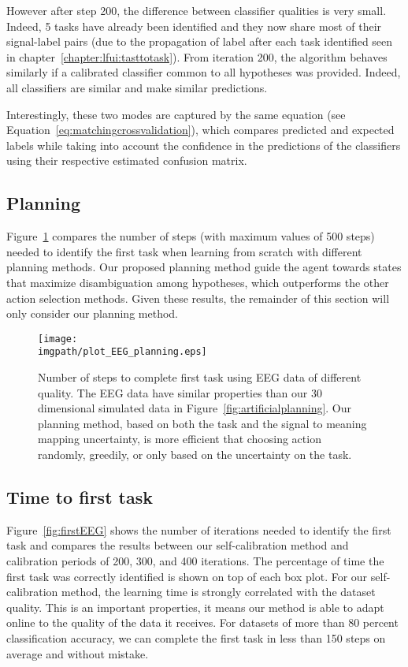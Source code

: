 However after step 200, the difference between classifier qualities is very small. Indeed, 5 tasks have already been identified and they now share most of their signal-label pairs (due to the propagation of label after each task identified seen in chapter~\ref{chapter:lfui:tasttotask}). From iteration 200, the algorithm behaves similarly if a calibrated classifier common to all hypotheses was provided. Indeed,  all classifiers are similar and make similar predictions.

Interestingly, these two modes are captured by the same equation (see Equation~\ref{eq:matchingcrossvalidation}), which compares predicted and expected labels while taking into account the confidence in the predictions of the classifiers using their respective estimated confusion matrix.

\subsection{Planning}

Figure~\ref{fig:planningEEG} compares the number of steps (with maximum values of 500 steps) needed to identify the first task when learning from scratch with different planning methods. Our proposed planning method guide the agent towards states that maximize disambiguation among hypotheses, which outperforms the other action selection methods. Given these results, the remainder of this section will only consider our planning method.

\begin{figure}[!htbp]
    \centering
    \texttt{[image: \\imgpath/plot\_EEG\_planning.eps]}
    \caption{Number of steps to complete first task using EEG data of different quality. The EEG data have similar properties than our 30 dimensional simulated data in Figure~\ref{fig:artificialplanning}. Our planning method, based on both the task and the signal to meaning mapping uncertainty, is more efficient that choosing action randomly, greedily, or only based on the uncertainty on the task.}
    \label{fig:planningEEG}
\end{figure}

\subsection{Time to first task}

Figure~\ref{fig:firstEEG} shows the number of iterations needed to identify the first task and compares the results between our self-calibration method and calibration periods of 200, 300, and 400 iterations. The percentage of time the first task was correctly identified is shown on top of each box plot. For our self-calibration method, the learning time is strongly correlated with the dataset quality. This is an important properties, it means our method is able to adapt online to the quality of the data it receives. For datasets of more than 80 percent classification accuracy, we can complete the first task in less than 150 steps on average and without mistake.


